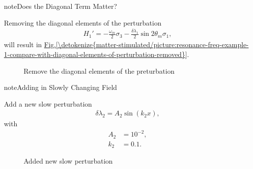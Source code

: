 \documentclass[letterpaper,12pt,english]{sphinxmanual}
\begin{document}
\begin{sphinxadmonition}{note}{Does the Diagonal Term Matter?}

Removing the diagonal elements of the perturbation
\begin{equation*}
\begin{split}H_1' = -\frac{\omega_m}{2} \sigma_3  - \frac{\delta \lambda_1}{2} \sin 2\theta_m \sigma_1,\end{split}
\end{equation*}
will result in \hyperref[\detokenize{matter-stimulated/picture:resonance-freq-example-1-compare-with-diagonal-elements-of-perturbation-removed}]{Fig.\@ \ref{\detokenize{matter-stimulated/picture:resonance-freq-example-1-compare-with-diagonal-elements-of-perturbation-removed}}}.
\begin{figure}[htbp]
\centering
\capstart

\noindent{}
\caption{Remove the diagonal elements of the preturbation}\label{\detokenize{matter-stimulated/picture:resonance-freq-example-1-compare-with-diagonal-elements-of-perturbation-removed}}\label{\detokenize{matter-stimulated/picture:id5}}\end{figure}
\end{sphinxadmonition}

\begin{sphinxadmonition}{note}{Adding in Slowly Changing Field}

Add a new slow perturbation
\begin{equation*}
\begin{split}\delta \lambda_2 = A_2 \sin (k_2 x),\end{split}
\end{equation*}
with
\begin{equation*}
\begin{split}A_2 &= 10^{-2},\\
k_2 &= 0.1.\end{split}
\end{equation*}\begin{figure}[htbp]
\centering
\capstart

\noindent{}
\caption{Added new slow perturbation}\label{\detokenize{matter-stimulated/picture:id6}}\end{figure}
\end{sphinxadmonition}
\end{document}
